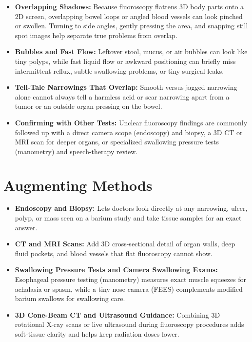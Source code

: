 \begin{itemize}
    \item \textbf{Overlapping Shadows:} Because fluoroscopy flattens 3D body parts onto a 2D screen, overlapping bowel loops or angled blood vessels can look pinched or swollen. Turning to side angles, gently pressing the area, and snapping still spot images help separate true problems from overlap.
    \item \textbf{Bubbles and Fast Flow:} Leftover stool, mucus, or air bubbles can look like tiny polyps, while fast liquid flow or awkward positioning can briefly miss intermittent reflux, subtle swallowing problems, or tiny surgical leaks.
    \item \textbf{Tell-Tale Narrowings That Overlap:} Smooth versus jagged narrowing alone cannot always tell a harmless acid or scar narrowing apart from a tumor or an outside organ pressing on the bowel.
    \item \textbf{Confirming with Other Tests:} Unclear fluoroscopy findings are commonly followed up with a direct camera scope (endoscopy) and biopsy, a 3D CT or MRI scan for deeper organs, or specialized swallowing pressure tests (manometry) and speech-therapy review.
\end{itemize}

\section{Augmenting Methods}

\begin{itemize}
    \item \textbf{Endoscopy and Biopsy:} Lets doctors look directly at any narrowing, ulcer, polyp, or mass seen on a barium study and take tissue samples for an exact answer.
    \item \textbf{CT and MRI Scans:} Add 3D cross-sectional detail of organ walls, deep fluid pockets, and blood vessels that flat fluoroscopy cannot show.
    \item \textbf{Swallowing Pressure Tests and Camera Swallowing Exams:} Esophageal pressure testing (manometry) measures exact muscle squeezes for achalasia or spasm, while a tiny nose camera (FEES) complements modified barium swallows for swallowing care.
    \item \textbf{3D Cone-Beam CT and Ultrasound Guidance:} Combining 3D rotational X-ray scans or live ultrasound during fluoroscopy procedures adds soft-tissue clarity and helps keep radiation doses lower.
\end{itemize}

